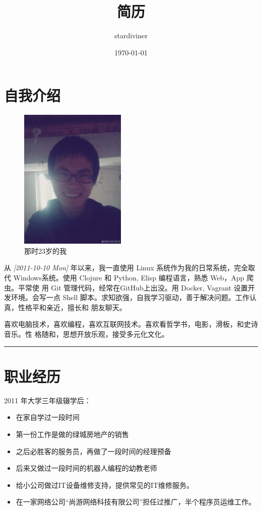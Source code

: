\documentclass[11pt]{article}
\author{stardiviner}
\date{\today}
\title{简历}
\begin{document}
\maketitle

\section{自我介绍}
\label{sec:org9001276}

\begin{figure}[htbp]
\centering
\includegraphics[width=2.0in]{data/images/me_picture 23.jpg}
\caption{那时23岁的我}
\end{figure}


从 \textit{[2011-10-10 Mon] } 年以来，我一直使用 Linux 系统作为我的日常系统，完全取代
Windows系统。使用 Clojure 和 Python, Elisp 编程语言，熟悉 Web，App 爬虫。平常使
用 Git 管理代码，经常在GitHub上出没。用 Docker, Vagrant 设置开发环境。会写一点
Shell 脚本。求知欲强，自我学习驱动，善于解决问题。工作认真，性格平和亲近，擅长和
朋友聊天。

喜欢电脑技术，喜欢编程，喜欢互联网技术。喜欢看哲学书，电影，滑板，和史诗音乐。性
格随和，思想开放乐观，接受多元化文化。

\noindent\rule{\textwidth}{0.8pt}

\section{职业经历}
\label{sec:org1e942f8}

2011 年大学三年级辍学后：

\begin{itemize}
\item 在家自学过一段时间
\item 第一份工作是做的绿城房地产的销售
\item 之后必胜客的服务员，再做了一段时间的经理预备
\item 后来又做过一段时间的机器人编程的幼教老师
\item 给小公司做过IT设备维修支持，提供常见的IT维修服务。
\item 在一家网络公司“尚游网络科技有限公司”担任过推广，半个程序员运维工作。
\end{itemize}
\end{document}
